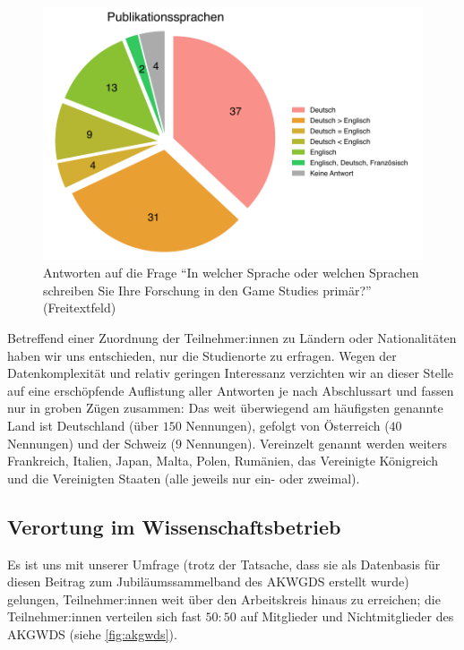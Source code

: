 \documentclass{scrartcl}
\begin{document}
\begin{figure}[t]
   \includegraphics[width=1\textwidth]{sprache.pdf}
   \caption{Antworten auf die Frage \enquote{In welcher Sprache oder welchen Sprachen schreiben Sie Ihre Forschung in den Game Studies primär?} (Freitextfeld)}
   \label{fig:sprache}
\end{figure}

Betreffend einer Zuordnung der Teilnehmer:innen zu Ländern oder Nationalitäten haben wir uns entschieden, nur die Studienorte zu erfragen.
Wegen der Datenkomplexität und relativ geringen Interessanz verzichten wir an dieser Stelle auf eine erschöpfende Auflistung aller Antworten je nach Abschlussart und fassen nur in groben Zügen zusammen:
Das weit überwiegend am häufigsten genannte Land ist Deutschland (über $150$ Nennungen), gefolgt von Österreich ($40$ Nennungen) und der Schweiz ($9$ Nennungen).
Vereinzelt genannt werden weiters Frankreich, Italien, Japan, Malta, Polen, Rumänien, das Vereinigte Königreich und die Vereinigten Staaten (alle jeweils nur ein- oder zweimal).


\subsection{Verortung im Wissenschaftsbetrieb}\label{sec:resultate_verortung}
Es ist uns mit unserer Umfrage (trotz der Tatsache, dass sie als Datenbasis für diesen Beitrag zum Jubiläumssammelband des AKWGDS erstellt wurde) gelungen, Teilnehmer:innen weit über den Arbeitskreis hinaus zu erreichen; die Teilnehmer:innen verteilen sich fast $50:50$ auf Mitglieder und Nichtmitglieder des AKGWDS (siehe \autoref{fig:akgwds}).
\end{document}
